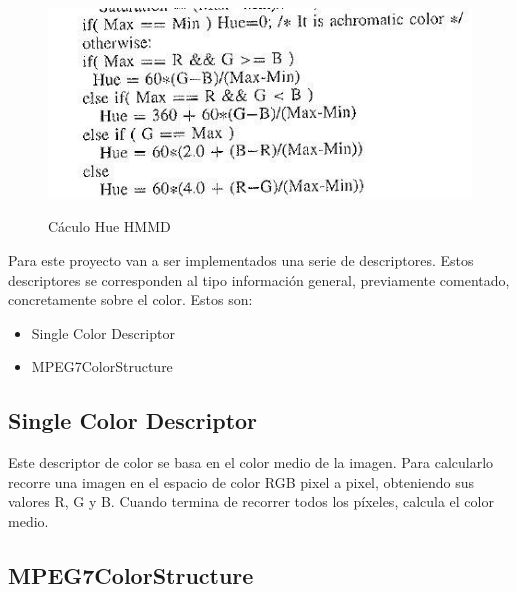 \begin{figure}[H] %
\centering
\includegraphics[scale=0.7]{imagenes/hmmd2.jpg}  %
\label{hmmd2.jpg}
\caption{Cáculo Hue HMMD}
\end{figure}


Para este proyecto van a ser implementados una serie de descriptores. Estos descriptores se corresponden al tipo información general, previamente comentado, concretamente sobre el color. Estos son:

\begin{itemize}

\item Single Color Descriptor

\item MPEG7ColorStructure

\end{itemize}

\subsection{Single Color Descriptor}

Este descriptor de color se basa en el color medio de la imagen. Para calcularlo recorre una imagen en el espacio de color RGB pixel a pixel, obteniendo sus valores R, G y B. Cuando termina de recorrer todos los píxeles, calcula el color medio.

\subsection{MPEG7ColorStructure}







